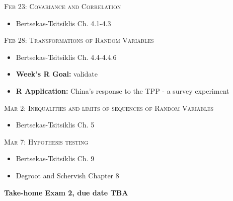 \documentclass[11pt]{article}
\begin{document}
\noindent \textsc{Feb 23: Covariance and Correlation}

\begin{itemize}

 \item Bertsekas-Tsitsiklis Ch. 4.1-4.3
 
\end{itemize}

\noindent \textsc{Feb 28: Transformations of Random Variables}

\begin{itemize}

 \item Bertsekas-Tsitsiklis Ch. 4.4-4.4.6
 
\item  {\bf Week's R Goal:} validate 
 \item  {\bf R Application:} China's response to the TPP - a survey experiment

\end{itemize}

\noindent \textsc{Mar 2: Inequalities and limits of sequences of Random Variables}

\begin{itemize}

 \item Bertsekas-Tsitsiklis Ch. 5

\end{itemize}

\noindent \textsc{Mar 7:  Hypothesis testing}

\begin{itemize}

 \item Bertsekas-Tsitsiklis Ch. 9
 \item Degroot and Schervish Chapter 8

\end{itemize}
\noindent \textbf{Take-home Exam 2, due date TBA}
\end{document}
